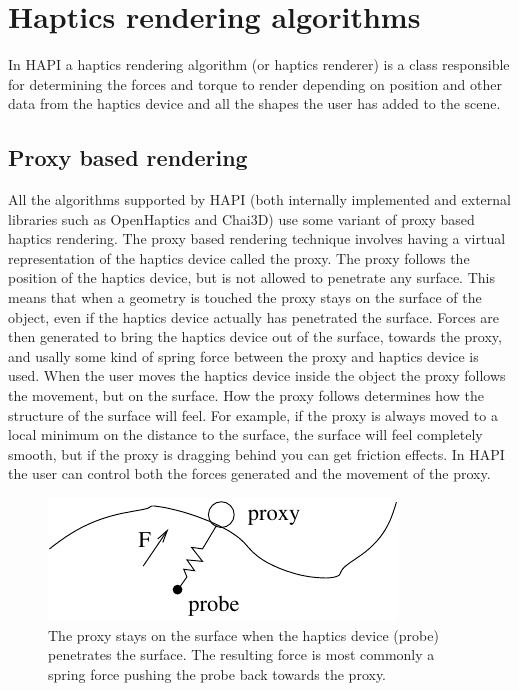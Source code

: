 
\chapter {Haptics rendering algorithms}
\label{secHapticsRenderingAlgorithms}
In HAPI a haptics rendering algorithm (or haptics renderer) is a class
responsible for determining the forces and torque to render depending
on position and other data from the haptics device and all the shapes
the user has added to the scene. 

\section{Proxy based rendering}
All the algorithms supported by HAPI (both internally implemented and
external libraries such as OpenHaptics and Chai3D) use some variant of
proxy based haptics rendering. The proxy based rendering technique
involves having a virtual representation of the haptics device called
the proxy. The proxy follows the position of the haptics device, but
is not allowed to penetrate any surface. This means that when a
geometry is touched the proxy stays on the surface of the object, even
if the haptics device actually has penetrated the surface. Forces are
then generated to bring the haptics device out of the surface, towards
the proxy, and usally some kind of spring force between the proxy and
haptics device is used. When the user moves the haptics device inside
the object the proxy follows the movement, but on the surface. How the
proxy follows determines how the structure of the surface will
feel. For example, if the proxy is always moved to a local minimum on
the distance to the surface, the surface will feel completely smooth,
but if the proxy is dragging behind you can get friction effects. In
HAPI the user can control both the forces generated and the movement
of the proxy.

\begin{figure} 
  \centering 
  \includegraphics{images/proxyfinger.pdf}
  \caption{The proxy stays on the surface when the haptics
  device (probe) penetrates the surface. The resulting force is most
  commonly a spring force pushing the probe back towards the proxy.} 
  \label{Proxy-probe} 
\end{figure}



